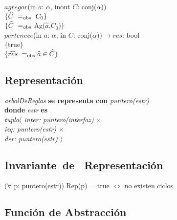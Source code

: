 $agregar$(in $a$: $\alpha$, inout $C$: conj($\alpha$))\\
$\{\widehat{C}\ =_{\mathrm{obs}}\ C_0\}$\\
$\{\widehat{C}\ =_{\mathrm{obs}}$ Ag($\widehat{a}$,$C_0$)$\}$\\

$pertenece$(in $a$: $\alpha$, in $C$: conj($\alpha$))$\longrightarrow res$: bool\\
$\{$true$\}$\\
$\{\widehat{res}\ =_{\mathrm{obs}} \widehat{a}\in \widehat{C}\}$\\

\subsection*{Representaci\'on}
\textit{arbolDeReglas} \textbf{se representa con} \textit{puntero(estr)}\\
\textbf{donde} \textit{estr} \textbf{es}\\
\textit{tupla$\langle$ inter: puntero(interfaz) $\times$\\
\hspace*{1.1cm}izq: puntero(estr) $\times$\\
\hspace*{1.1cm}der: puntero(estr) $\rangle$}

\subsection*{Invariante\ de \ Representaci\'on}
\textbf{}
\vspace{11pt}
($\forall$ p: puntero(estr)) Rep(p) = true $\Leftrightarrow$ no existen ciclos
\vspace{33pt}

\subsection*{Funci\'on de Abstracci\'on}

